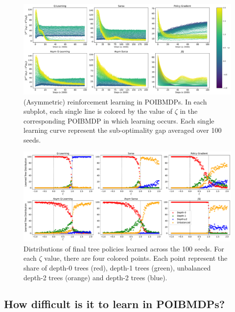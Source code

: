 \begin{figure}
    \centering
    \includegraphics[width=1\textwidth]{images/images_part1/learning_curves.pdf}
    \caption{(Asymmetric) reinforcement learning in POIBMDPs. 
    In each subplot, each single line is colored by the value of $\zeta$ in the corresponding POIBMDP in which learning occurs. 
    Each single learning curve represent the sub-optimality gap averaged over 100 seeds.
    }\label{fig:rl-poibmdp}
\end{figure}

\begin{figure}
    \centering
    \includegraphics[width=1\textwidth]{images/images_part1/tree_distributions.pdf}
    \caption{Distributions of final tree policies learned across the 100 seeds.
    For each $\zeta$ value, there are four colored points. Each point represent the share of depth-0 trees (red), depth-1 trees (green), unbalanced depth-2 trees (orange) and depth-2 trees (blue).
    }\label{fig:dt-distrib-poibmdp}
\end{figure}


\subsection{How difficult is it to learn in POIBMDPs?}


